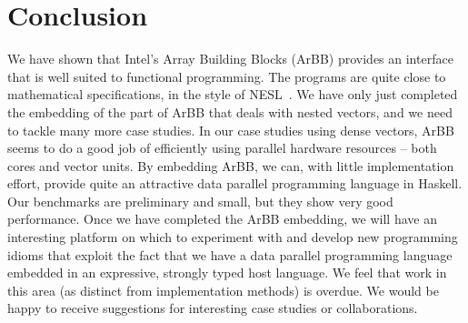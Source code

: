 \section{Conclusion} 
We have shown that Intel's Array Building Blocks (ArBB) provides
an interface that is well suited to functional programming. 
The programs are quite close to mathematical specifications, in the style of NESL~\cite{NESL}. We have only just completed the embedding of the part of ArBB that deals with nested vectors, and we need to tackle many more case studies.
In our case studies using dense vectors, ArBB seems to do a good job of efficiently using parallel
hardware resources -- both cores and vector units.
By
embedding ArBB, we can, with little implementation effort, provide
quite an attractive data parallel programming language in Haskell.
Our benchmarks are preliminary and small, but they show very good performance.
Once we have completed the ArBB embedding, we will have an interesting platform on which to
experiment with and develop new programming idioms that exploit the fact
that we have a data parallel programming language embedded in an
expressive, strongly typed host language.
We feel that work in this area (as distinct from implementation methods)
is overdue. We would be happy to receive suggestions
for interesting case studies or collaborations.

